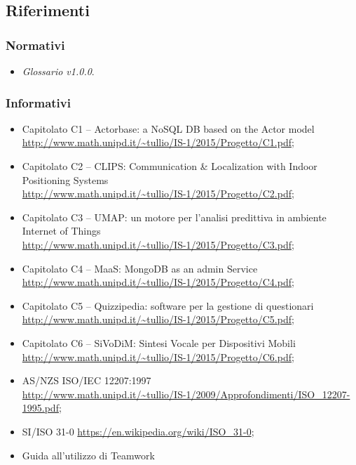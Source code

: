 \subsection{Riferimenti}

\subsubsection{Normativi}
\begin{itemize}
	\item \textit{Glossario v1.0.0}.
\end{itemize}

\subsubsection{Informativi}
\begin{itemize}
	\item Capitolato C1 – Actorbase: a NoSQL DB based on the Actor model\\
	\url{http://www.math.unipd.it/~tullio/IS-1/2015/Progetto/C1.pdf};
	\item Capitolato C2 – CLIPS: Communication \& Localization with Indoor Positioning Systems\\
	\url{http://www.math.unipd.it/~tullio/IS-1/2015/Progetto/C2.pdf};
	\item Capitolato C3 – UMAP: un motore per l’analisi predittiva in ambiente Internet of Things\\
	\url{http://www.math.unipd.it/~tullio/IS-1/2015/Progetto/C3.pdf};
	\item Capitolato C4 – MaaS: MongoDB as an admin Service\\
	\url{http://www.math.unipd.it/~tullio/IS-1/2015/Progetto/C4.pdf};
	\item Capitolato C5 – Quizzipedia: software per la gestione di questionari\\
	\url{http://www.math.unipd.it/~tullio/IS-1/2015/Progetto/C5.pdf};
	\item Capitolato C6 – SiVoDiM: Sintesi Vocale per Dispositivi Mobili\\
	\url{http://www.math.unipd.it/~tullio/IS-1/2015/Progetto/C6.pdf};
	\item AS/NZS ISO/IEC 12207:1997 \\
	\url{http://www.math.unipd.it/~tullio/IS-1/2009/Approfondimenti/ISO\_12207-1995.pdf};
	\item SI/ISO 31-0
	\url{https://en.wikipedia.org/wiki/ISO_31-0};
	\item Guida all'utilizzo di Teamwork\G\\

\end{itemize}
